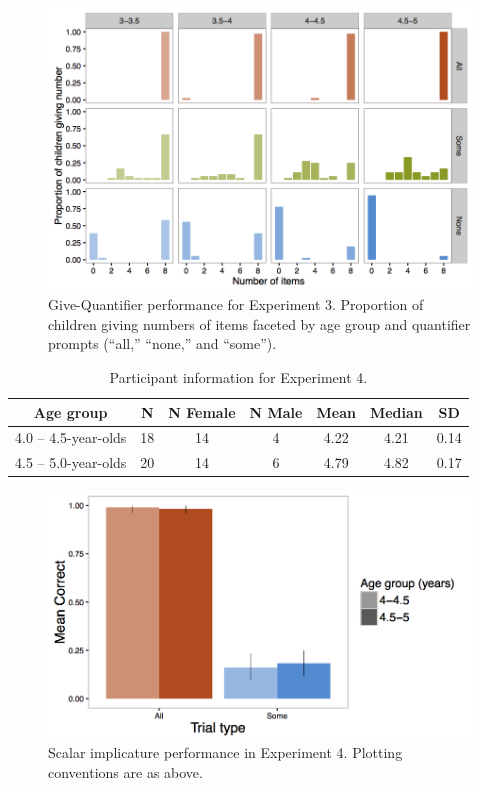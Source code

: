 \documentclass[man]{apa2}
\begin{document}
\begin{figure}
 \begin{center}
  \includegraphics[width=4.5in]{figures/exp3_GQhist.png}
  \caption{\label{fig:GQ_spread} Give-Quantifier performance for Experiment 3. Proportion of children giving numbers of items faceted by age group and quantifier prompts (``all,'' ``none,'' and ``some'').}
 \end{center}
\end{figure}

\begin{table}
\centering
\begin{tabular}{ccccccc}
\hline
{\bf Age group} & {\bf N} & {\bf N Female} & {\bf N Male} & {\bf Mean} & {\bf Median} & {\bf SD} \\
\hline
4.0 -- 4.5-year-olds & 18 & 14 & 4 & 4.22 & 4.21 & 0.14\\
4.5 -- 5.0-year-olds & 20 & 14 & 6 & 4.79 & 4.82 & 0.17\\
\hline
\end{tabular}
\caption{\label{tab:exp_4_demo} Participant information for Experiment 4.}
\end{table}

\begin{figure}
 \begin{center}
  \includegraphics[width=4.5in]{figures/exp4_SIperf.png}
  \caption{\label{fig:exp4_si} Scalar implicature performance in Experiment 4. Plotting conventions are as above.}
 \end{center}
\end{figure}


%
%
\end{document}
